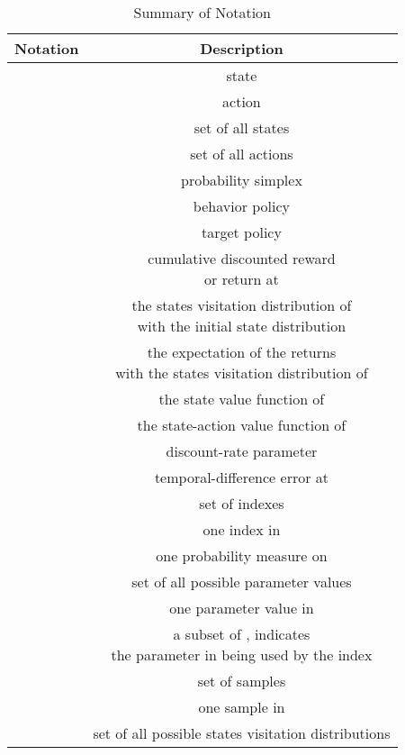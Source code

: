 \documentclass[nohyperref]{article}
\theoremstyle{plain}
\begin{document}
\begin{table}[!hb]
	\centering
	\caption{Summary of Notation}
	\label{tab: notation}
	\begin{tabular}{|c |c| }
	    \hline
		\textbf{Notation} &\textbf{Description}\\
		\hline
	     & state \\
	    \hline
	     & action \\
	    \hline
	     & set of all states \\
	    \hline
	     & set of all actions \\
	    \hline
	      & probability simplex \\
	    \hline
	     & behavior policy \\
	    \hline
	     & target policy \\
	    \hline
	     & \makecell[c]{cumulative discounted reward \\ or return at } \\
	    \hline
	      & \makecell[c]{the states visitation distribution of  \\ with the initial state distribution 
	    } \\
	    \hline
	         & \makecell[c]{the expectation of the returns \\ with the states visitation distribution of } \\
	    \hline
	     & the state value function of \\
	    \hline
	     &  the state-action value function of \\
	    \hline
	     & discount-rate parameter \\
	    \hline
	     & temporal-difference error at \\
	    \hline
	     & set of indexes  \\
	    \hline
	     & one index in  \\
	    \hline
	     & one probability measure on  \\
	    \hline
	      & set of all possible parameter values \\
	    \hline
	      & one parameter value in  \\
	    \hline
	     & \makecell[c]{a subset of , indicates \\ the parameter in  being used by the index } \\
	    \hline
	     & set of samples \\
	    \hline
	     & one sample in  \\
	    \hline
	     & set of all possible states visitation distributions \\

\end{tabular}
\end{table}
\end{document}
